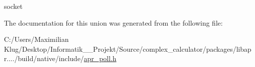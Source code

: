 socket 

The documentation for this union was generated from the following file\+:\begin{DoxyCompactItemize}
\item 
C\+:/\+Users/\+Maximilian Klug/\+Desktop/\+Informatik\+\_\+\_\+\+Projekt/\+Source/complex\+\_\+calculator/packages/libapr..../build/native/include/\mbox{\hyperlink{apr__poll_8h}{apr\+\_\+poll.\+h}}\end{DoxyCompactItemize}
